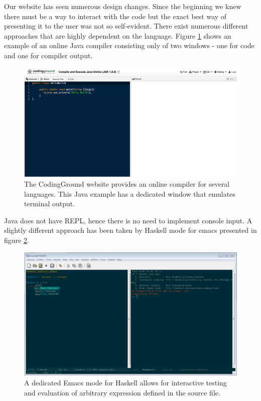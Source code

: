 Our website has seen numerous design changes. Since the beginning we knew there must be a way to interact with the code but the exact best way of presenting it to the user was not so self-evident. There exist numerous different approaches that are highly dependent on the language. Figure \ref{java_console} shows an example of an online  Java  compiler consisting only of two windows - one for code and one for compiler output.
\begin{figure}
\includegraphics[scale=0.3]{java.png}
\caption{The CodingGround website provides an online compiler for several languages. This Java example has a dedicated window that emulates terminal output.}
\label{java_console}
\end{figure}
Java does not have REPL, hence there is no need to implement console input.
A slightly different approach has been taken by Haskell mode for emacs presented in figure \ref{haskell_repl}. 
\begin{figure}
\centering
\includegraphics[scale=0.45]{haskell.png}
\caption{A dedicated Emacs mode for Haskell allows for interactive testing and evaluation of arbitrary expression defined in the source file.}
\label{haskell_repl}
\end{figure}
